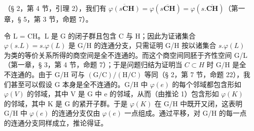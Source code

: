 （§ 2，第 4 节，引理 2），我们有 \(\overline{\varphi(s\mathbf{CH})} = \varphi(\overline{s\mathbf{CH}}) = \varphi(s.\overline{\mathbf{CH}})\)（第一章，§ 5，第 3 节，命题 7）。

令 L = CH。L 是 G 的闭子群且包含 C 与 H；因此为证诸集合 \(\varphi(s.L) = s.\varphi(L)\) 是 G/H 的连通分支，只需证明 G/H 按以诸集合 \(s.\varphi(L)\) 为类的等价关系所得的商空间是全不连通的。而这个商空间同胚于齐性空间 G/L（第一章，§ 3，第 4 节，命题 7）；于是问题归结为证明当 \(C \subset H\) 时 G/H 是全不连通的。由于 G/H 可与 \((\mathrm{G/C})/(\mathrm{H/C})\) 等同（§ 2，第 7 节，命题 22），我们甚至可以假设 G 本身是全不连通的。G/H 中 \(\varphi(e)\) 的每个邻域都包含形如 \(\varphi(V)\) 的邻域，其中 V 是 G 中 e 的邻域，从而（由推论 1）包含形如 \(\varphi(K)\) 的邻域，其中 K 是 G 的紧开子群。于是 \(\varphi(K)\) 在 G/H 中既开又闭，这表明 G/H 中 \(\varphi(e)\) 的连通分支仅由 \(\varphi(e)\) 一点组成。通过平移，对 G/H 的每一点的连通分支同样成立，推论得证。


